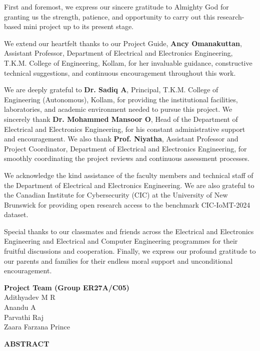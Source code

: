 \documentclass[12pt,a4paper]{report}
\begin{document}
\noindent
First and foremost, we express our sincere gratitude to Almighty God for granting us the strength, patience, and opportunity to carry out this research-based mini project up to its present stage.

We extend our heartfelt thanks to our Project Guide, \textbf{Ancy Omanakuttan}, Assistant Professor, Department of Electrical and Electronics Engineering, T.K.M. College of Engineering, Kollam, for her invaluable guidance, constructive technical suggestions, and continuous encouragement throughout this work.

We are deeply grateful to \textbf{Dr. Sadiq A}, Principal, T.K.M. College of Engineering (Autonomous), Kollam, for providing the institutional facilities, laboratories, and academic environment needed to pursue this project. We sincerely thank \textbf{Dr. Mohammed Mansoor O}, Head of the Department of Electrical and Electronics Engineering, for his constant administrative support and encouragement. We also thank \textbf{Prof. Niyatha}, Assistant Professor and Project Coordinator, Department of Electrical and Electronics Engineering, for smoothly coordinating the project reviews and continuous assessment processes.

We acknowledge the kind assistance of the faculty members and technical staff of the Department of Electrical and Electronics Engineering. We are also grateful to the Canadian Institute for Cybersecurity (CIC) at the University of New Brunswick for providing open research access to the benchmark CIC-IoMT-2024 dataset.

Special thanks to our classmates and friends across the Electrical and Electronics Engineering and Electrical and Computer Engineering programmes for their fruitful discussions and cooperation. Finally, we express our profound gratitude to our parents and families for their endless moral support and unconditional encouragement.

\vspace{1.2cm}
\noindent
\textbf{Project Team (Group ER27A/C05)} \\
Adithyadev M R \\
Anandu A \\
Parvathi Raj \\
Zaara Farzana Prince

\newpage
\begin{center}
    {\Large \bfseries ABSTRACT\par}
\end{center}
\vspace{0.8cm}
\end{document}
